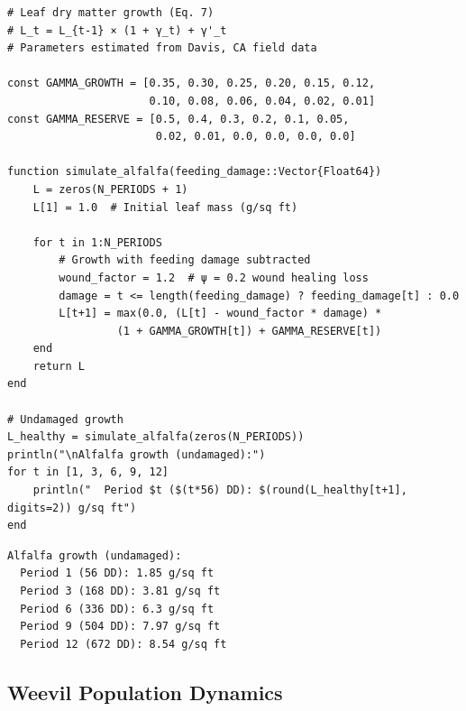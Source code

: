\begin{verbatim}
# Leaf dry matter growth (Eq. 7)
# L_t = L_{t-1} × (1 + γ_t) + γ'_t
# Parameters estimated from Davis, CA field data

const GAMMA_GROWTH = [0.35, 0.30, 0.25, 0.20, 0.15, 0.12,
                      0.10, 0.08, 0.06, 0.04, 0.02, 0.01]
const GAMMA_RESERVE = [0.5, 0.4, 0.3, 0.2, 0.1, 0.05,
                       0.02, 0.01, 0.0, 0.0, 0.0, 0.0]

function simulate_alfalfa(feeding_damage::Vector{Float64})
    L = zeros(N_PERIODS + 1)
    L[1] = 1.0  # Initial leaf mass (g/sq ft)

    for t in 1:N_PERIODS
        # Growth with feeding damage subtracted
        wound_factor = 1.2  # ψ = 0.2 wound healing loss
        damage = t <= length(feeding_damage) ? feeding_damage[t] : 0.0
        L[t+1] = max(0.0, (L[t] - wound_factor * damage) *
                 (1 + GAMMA_GROWTH[t]) + GAMMA_RESERVE[t])
    end
    return L
end

# Undamaged growth
L_healthy = simulate_alfalfa(zeros(N_PERIODS))
println("\nAlfalfa growth (undamaged):")
for t in [1, 3, 6, 9, 12]
    println("  Period $t ($(t*56) DD): $(round(L_healthy[t+1], digits=2)) g/sq ft")
end
\end{verbatim}




\begin{verbatim}
Alfalfa growth (undamaged):
  Period 1 (56 DD): 1.85 g/sq ft
  Period 3 (168 DD): 3.81 g/sq ft
  Period 6 (336 DD): 6.3 g/sq ft
  Period 9 (504 DD): 7.97 g/sq ft
  Period 12 (672 DD): 8.54 g/sq ft
\end{verbatim}



\subsection{Weevil Population Dynamics}



\label{2275207826037396213}{}



